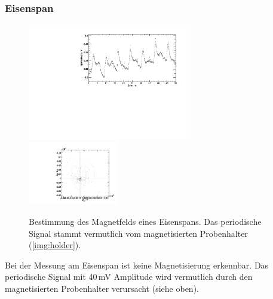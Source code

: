 \subsubsection{Eisenspan}
\begin{figure}[H]
\begin{center}
  \includegraphics[width=0.64\textwidth]{../img/Fe-Span.pdf}
  \includegraphics[width=0.35\textwidth]{../img/polar_Fe-Span.pdf}
  \caption{Bestimmung des Magnetfelds eines Eisenspans. Das periodische Signal stammt vermutlich
  vom magnetisierten Probenhalter (\autoref{img:holder}).}
  \label{img:fespan}
\end{center}
\end{figure}
Bei der Messung am Eisenspan ist keine Magnetisierung erkennbar.
Das periodische Signal mit 40\,mV Amplitude wird vermutlich durch den magnetisierten Probenhalter
verursacht (siehe oben).\\

